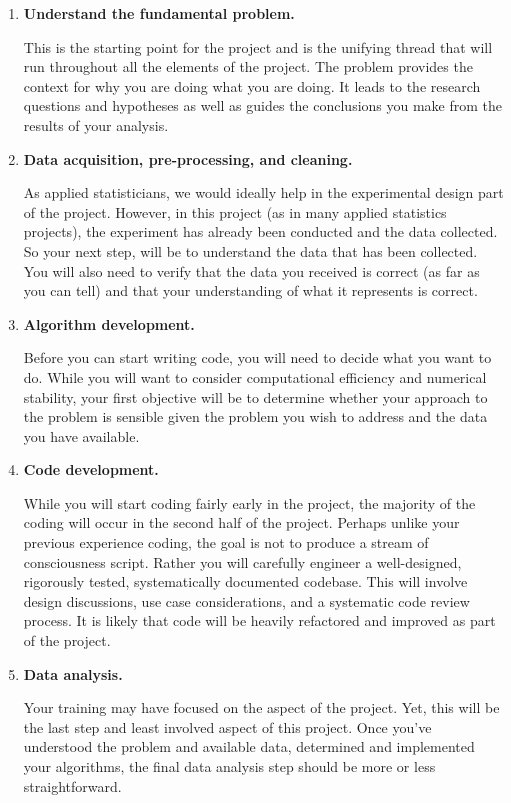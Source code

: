 \documentclass[11pt, oneside]{article}   	%
\begin{document}
\begin{enumerate}

\item \textbf{Understand the fundamental problem.}

This is the starting point for the project and is the unifying thread that will
run throughout all the elements of the project.  The problem provides the
context for why you are doing what you are doing.  It leads to the research questions
and hypotheses as well as guides the conclusions you make from the results of
your analysis.

\item \textbf{Data acquisition, pre-processing, and cleaning.}

As applied statisticians, we would ideally help in the experimental design part
of the project.  However, in this project (as in many applied statistics
projects), the experiment has already been conducted and the data collected.
So your next step, will be to understand the data that has been collected.  You
will also need to verify that the data you received is correct (as far as you
can tell) and that your understanding of what it represents is correct.

\item \textbf{Algorithm development.}

Before you can start writing code, you will need to decide what you want to do.
While you will want to consider computational efficiency and numerical
stability, your first objective will be to determine whether your approach to
the problem is sensible given the problem you wish to address and the data you
have available.

\item \textbf{Code development.}

While you will start coding fairly early in the project, the majority of the
coding will occur in the second half of the project.  Perhaps unlike your
previous experience coding, the goal is not to produce a stream of
consciousness script.  Rather you will carefully engineer a well-designed,
rigorously tested, systematically documented codebase.  This will involve
design discussions, use case considerations, and a systematic code review
process.  It is likely that code will be heavily refactored and improved as
part of the project.

\item \textbf{Data analysis.}

Your training may have focused on the aspect of the project.  Yet, this will be
the last step and least involved aspect of this project.  Once you've
understood the problem and available data, determined and implemented your
algorithms, the final data analysis step should be more or less
straightforward.

\end{enumerate}
\end{document}
